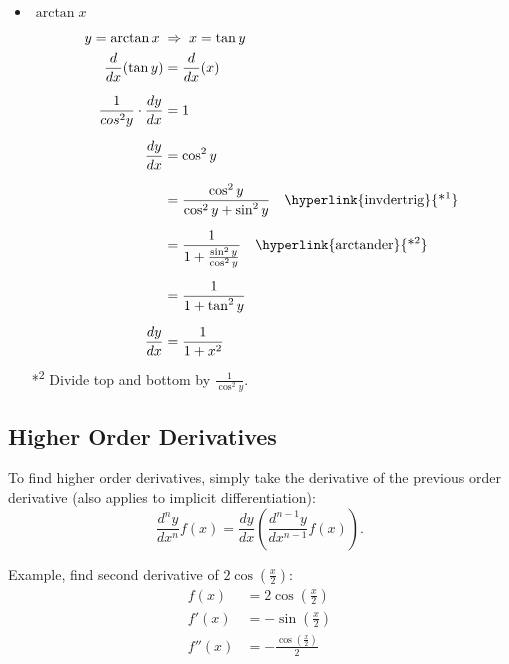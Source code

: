 \documentclass[12pt]{article}
\begin{document}
\begin{itemize}
    \item $\arctan{x}$
          \begin{align*}
              y = \arctan{x} \;                      & \Rightarrow \; x = \tan{y}                                                                           \\
              \frac{d}{dx} (\tan{y})                 & = \frac{d}{dx} (x)                                                                                   \\[6pt]
              \frac{1}{cos^2{y}} \cdot \frac{dy}{dx} & = 1                                                                                                  \\[6pt]
              \frac{dy}{dx}                          & = \cos^2{y}                                                                                          \\[6pt]
                                                     & = \frac{\cos^2{y}}{\cos^2{y} + \sin^2{y}} \quad \text{\hyperlink{invdertrig}{*\textsuperscript{1}}}  \\[6pt]
                                                     & = \frac{1}{1 + \frac{\sin^2{y}}{\cos^2{y}}} \quad \text{\hyperlink{arctander}{*\textsuperscript{2}}} \\[6pt]
                                                     & = \frac{1}{1 + \tan^2{y}}                                                                            \\[6pt]
              \frac{dy}{dx}                          & = \frac{1}{1 + x^2}
          \end{align*}
          \hypertarget{arctander}{*\textsuperscript{2} Divide top and bottom by $\frac{1}{\cos^2{y}}$.}
\end{itemize}

\subsection{Higher Order Derivatives}
To find higher order derivatives, simply take the derivative of the previous order derivative (also applies to implicit differentiation):
\[ \frac{d^n y}{dx^n} f(x) = \frac{dy}{dx} \left( \frac{d^{n-1}y}{dx^{n-1}} f(x) \right). \]

\noindent Example, find second derivative of $2\cos \left( \frac{x}{2} \right)$:
\begin{align*}
    f(x)   & = 2\cos \left( \frac{x}{2} \right)           \\[6pt]
    f'(x)  & = -\sin \left( \frac{x}{2} \right)           \\[6pt]
    f''(x) & = -\frac{\cos \left( \frac{x}{2} \right)}{2}
\end{align*}
\end{document}
